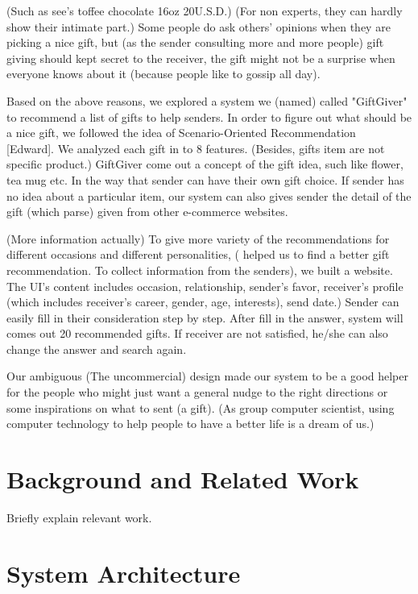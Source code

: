 \documentclass[11pt,twocolumn]{article}
\begin{document}
(Such as see’s toffee chocolate 16oz 20U.S.D.) (For non experts, they can hardly show their intimate part.)  Some people do ask others' opinions when they are picking a nice gift, but (as the sender consulting more and more people) gift giving should kept secret to the receiver, the gift might not be a surprise when everyone knows about it (because people like to gossip all day).

Based on the above reasons, we explored a system we (named) called "GiftGiver" to recommend a list of gifts to help senders. In order to figure out what should be a nice gift,  we followed the idea of Scenario-Oriented Recommendation~\cite{Shen} [Edward].   We analyzed each gift in to 8 features.  (Besides, gifts item are not specific product.)   GiftGiver come out a concept of the gift idea, such like flower, tea mug etc.  In the way that sender can have their own gift choice.  If sender has no idea about a particular item, our system can also gives sender the detail of the gift (which parse) given from other e-commerce websites.

(More information actually) To give more variety of the recommendations for different occasions and different personalities, ( helped us to find a better gift recommendation.   To collect information from the senders), we built a website.   The UI’s content includes occasion, relationship, sender's favor, receiver's profile (which includes receiver's career, gender, age, interests), send date.)
Sender can easily fill in their consideration step by step. 
After fill in the answer, system will comes out 20 recommended gifts.  If receiver are not satisfied, he/she can also change the answer and search again.

Our ambiguous (The uncommercial) design made our system to be a good helper for the people who might just want a general nudge to the right directions or some inspirations on what to sent (a gift).  (As group computer scientist, using computer technology to help people to have a better life is a dream of us.)


\section{Background and Related Work}

Briefly explain relevant work.

\section{System Architecture}
\end{document}
